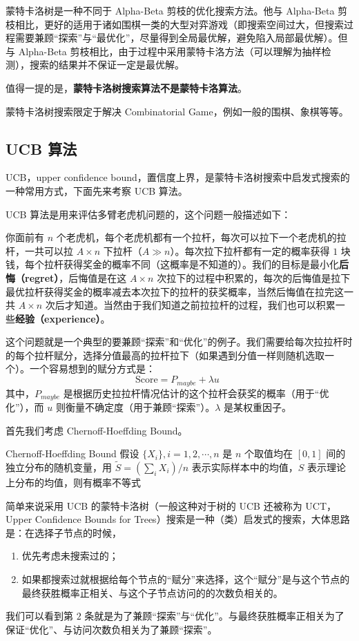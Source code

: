 
\begin{issues}
\issueDraft
\issueTODO
\end{issues}


蒙特卡洛树是一种不同于 Alpha-Beta 剪枝的优化搜索方法。他与 Alpha-Beta 剪枝相比，更好的适用于诸如围棋一类的大型对弈游戏（即搜索空间过大，但搜索过程需要兼顾“探索”与“最优化”，尽量得到全局最优解，避免陷入局部最优解）。但与 Alpha-Beta 剪枝相比，由于过程中采用蒙特卡洛方法（可以理解为抽样检测），搜索的结果并不保证一定是最优解。

值得一提的是，\textbf{蒙特卡洛树搜索算法不是蒙特卡洛算法}。

蒙特卡洛树搜索限定于解决 Combinatorial Game，例如一般的围棋、象棋等等。

\subsection{UCB 算法}
UCB，upper confidence bound，置信度上界，是蒙特卡洛树搜索中启发式搜索的一种常用方式，下面先来考察 UCB 算法。





UCB 算法是用来评估多臂老虎机问题的，这个问题一般描述如下：

你面前有 $n$ 个老虎机，每个老虎机都有一个拉杆，每次可以拉下一个老虎机的拉杆，一共可以拉 $A\times n$ 下拉杆（$A \gg n$）。每次拉下拉杆都有一定的概率获得 $1$ 块钱，每个拉杆获得奖金的概率不同（这概率是不知道的）。我们的目标是最小化\textbf{后悔（regret）}，后悔值是在这 $A\times n$ 次拉下的过程中积累的，每次的后悔值是拉下最优拉杆获得奖金的概率减去本次拉下的拉杆的获奖概率，当然后悔值在拉完这一共 $A\times n$ 次后才知道。当然由于我们知道之前拉拉杆的过程，我们也可以积累一些\textbf{经验（experience）}。

这个问题就是一个典型的要兼顾“探索”和“优化”的例子。我们需要给每次拉拉杆时的每个拉杆赋分，选择分值最高的拉杆拉下（如果遇到分值一样则随机选取一个）。一个容易想到的赋分方式是：
$$\text{Score} = P_{maybe} + \lambda u ~~$$
其中，$P_{maybe}$ 是根据历史拉拉杆情况估计的这个拉杆会获奖的概率（用于“优化”），而 $u$ 则衡量不确定度（用于兼顾“探索”）。$\lambda$ 是某权重因子。

首先我们考虑 Chernoff-Hoeffding Bound。
\begin{theorem}{Chernoff-Hoeffding Bound}
假设 $\{X_i\}, i=1, 2, \cdots, n$ 是 $n$ 个取值均在 $[0, 1]$ 间的独立分布的随机变量，用 $\widetilde S = \left(\sum_{i} X_i\right)/n$ 表示实际样本中的均值，$S$ 表示理论上分布的均值，则有概率不等式
$$$$
\end{theorem}





简单来说采用 UCB 的蒙特卡洛树（一般这种对于树的 UCB 还被称为 UCT，Upper Confidence Bounds for Trees）搜索是一种（类）启发式的搜索，大体思路是：在选择子节点的时候，
\begin{enumerate}
\item 优先考虑未搜索过的；
\item 如果都搜索过就根据给每个节点的“赋分”来选择，这个“赋分”是与这个节点的最终获胜概率正相关、与这个子节点访问的的次数负相关的。
\end{enumerate}
我们可以看到第 $2$ 条就是为了兼顾“探索”与“优化”。与最终获胜概率正相关为了保证“优化”、与访问次数负相关为了兼顾“探索”。